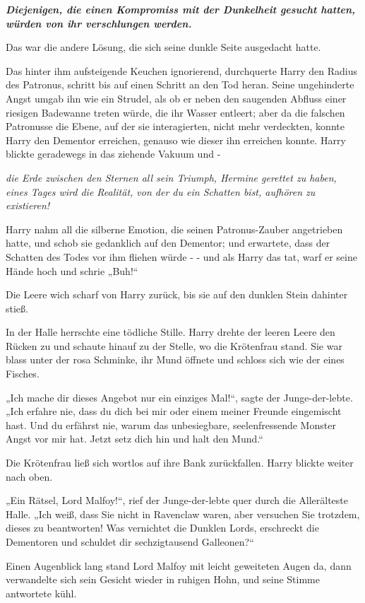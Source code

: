 {\textbf{\emph{Diejenigen, die einen Kompromiss mit der Dunkelheit gesucht hatten, würden von ihr verschlungen werden.}}

Das war die andere Lösung, die sich seine dunkle Seite ausgedacht hatte.

Das hinter ihm aufsteigende Keuchen ignorierend, durchquerte Harry den Radius des Patronus, schritt bis auf einen Schritt an den Tod heran. Seine ungehinderte Angst umgab ihn wie ein Strudel, als ob er neben den saugenden Abfluss einer riesigen Badewanne treten würde, die ihr Wasser entleert; aber da die falschen Patronusse die Ebene, auf der sie interagierten, nicht mehr verdeckten, konnte Harry den Dementor erreichen, genauso wie dieser ihn erreichen konnte. Harry blickte geradewegs in das ziehende Vakuum und -

\emph{die Erde zwischen den Sternen all sein Triumph, Hermine gerettet zu haben, eines Tages wird die Realität, von der du ein Schatten bist, aufhören zu existieren!}

Harry nahm all die silberne Emotion, die seinen Patronus-Zauber angetrieben hatte, und schob sie gedanklich auf den Dementor; und erwartete, dass der Schatten des Todes vor ihm fliehen würde - - und als Harry das tat, warf er seine Hände hoch und schrie „Buh!“

Die Leere wich scharf von Harry zurück, bis sie auf den dunklen Stein dahinter stieß.

In der Halle herrschte eine tödliche Stille. Harry drehte der leeren Leere den Rücken zu und schaute hinauf zu der Stelle, wo die Krötenfrau stand. Sie war blass unter der rosa Schminke, ihr Mund öffnete und schloss sich wie der eines Fisches.

„Ich mache dir dieses Angebot nur ein einziges Mal!“, sagte der Junge-der-lebte. „Ich erfahre nie, dass du dich bei mir oder einem meiner Freunde eingemischt hast. Und du erfährst nie, warum das unbesiegbare, seelenfressende Monster Angst vor mir hat. Jetzt setz dich hin und halt den Mund.“

Die Krötenfrau ließ sich wortlos auf ihre Bank zurückfallen. Harry blickte weiter nach oben.

„Ein Rätsel, Lord Malfoy!“, rief der Junge-der-lebte quer durch die Allerälteste Halle. „Ich weiß, dass Sie nicht in Ravenclaw waren, aber versuchen Sie trotzdem, dieses zu beantworten! Was vernichtet die Dunklen Lords, erschreckt die Dementoren und schuldet dir sechzigtausend Galleonen?“

Einen Augenblick lang stand Lord Malfoy mit leicht geweiteten Augen da, dann verwandelte sich sein Gesicht wieder in ruhigen Hohn, und seine Stimme antwortete kühl.

}
